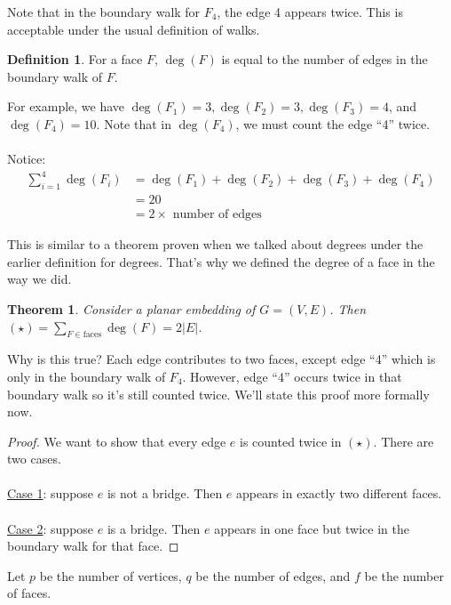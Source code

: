 \documentclass[]{article}
\newtheorem*{theorem}{Theorem}
\theoremstyle{definition}
\newtheorem*{defn}{Definition}
\begin{document}
			Note that in the boundary walk for $F_4$, the edge 4 appears twice. This is acceptable under the usual definition of walks.

			\begin{defn}
				For a face $F$, $\deg(F)$ is equal to the number of edges in the boundary walk of $F$.
			\end{defn}

			For example, we have $\deg(F_1) = 3, \deg(F_2) = 3, \deg(F_3) = 4$, and $\deg(F_4) = 10$. Note that in $\deg(F_4)$, we must count the edge ``4'' twice.
			\\ \\
			Notice:
			\begin{align*}
				\sum_{i = 1}^{4} \deg(F_i) &= \deg(F_1) + \deg(F_2) + \deg(F_3) + \deg(F_4) \\
				&= 20 \\
				&= 2 \times \text{ number of edges}
			\end{align*}

			This is similar to a theorem proven when we talked about degrees under the earlier definition for degrees. That's why we defined the degree of a face in the way we did.

			\begin{theorem}
				Consider a planar embedding of $G = (V, E)$. Then $\displaystyle (\star) = \sum_{F \in \text{faces}} \deg(F) = 2|E|$.
			\end{theorem}

			Why is this true? Each edge contributes to two faces, except edge ``4'' which is only in the boundary walk of $F_4$. However, edge ``4'' occurs twice in that boundary walk so it's still counted twice. We'll state this proof more formally now.
			\begin{proof}
				We want to show that every edge $e$ is counted twice in $(\star)$. There are two cases.
				\\ \\
				\underline{Case 1}: suppose $e$ is not a bridge. Then $e$ appears in exactly two different faces.
				\\ \\
				\underline{Case 2}: suppose $e$ is a bridge. Then $e$ appears in one face but twice in the boundary walk for that face.
			\end{proof}

			Let $p$ be the number of vertices, $q$ be the number of edges, and $f$ be the number of faces.
			
\end{document}
